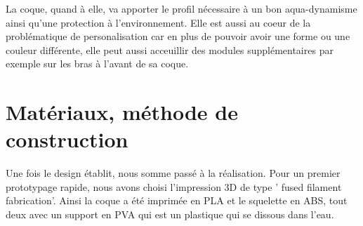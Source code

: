 \documentclass[a4paper,11pt]{report}
\begin{document}
			La coque, quand à elle, va apporter le profil nécessaire à un bon aqua-dynamisme ainsi qu'une protection à l'environnement. Elle est aussi au coeur de la problématique de personalisation car en plus de pouvoir avoir une forme ou une couleur différente, elle peut aussi acceuillir des modules supplémentaires par exemple sur les bras à l'avant de sa coque.
			
			\section{Matériaux, méthode de construction}
			
			Une fois le design établit, nous somme passé à la réalisation. Pour un premier prototypage rapide, nous avons choisi l'impression 3D de type ' fused filament fabrication'. Ainsi la coque a été imprimée en PLA et le squelette en ABS, tout deux avec un support en PVA qui est un plastique qui se dissous dans l'eau.
			
\end{document}
